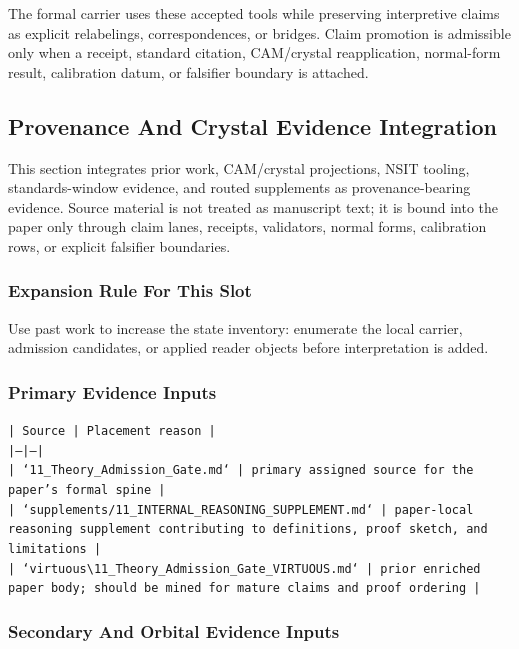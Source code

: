 \documentclass[11pt]{article}
\begin{document}
The formal carrier uses these accepted tools while preserving interpretive
claims as explicit relabelings, correspondences, or bridges. Claim promotion is admissible only when a receipt, standard citation,
CAM/crystal reapplication, normal-form result, calibration datum, or falsifier
boundary is attached.

\subsection*{Provenance And Crystal Evidence Integration}

This section integrates prior work, CAM/crystal projections, NSIT tooling,
standards-window evidence, and routed supplements as provenance-bearing
evidence. Source material is not treated as manuscript text; it is bound into
the paper only through claim lanes, receipts, validators, normal forms,
calibration rows, or explicit falsifier boundaries.

\subsubsection*{Expansion Rule For This Slot}

Use past work to increase the state inventory: enumerate the local carrier, admission candidates, or applied reader objects before interpretation is added.

\subsubsection*{Primary Evidence Inputs}

\noindent\texttt{| Source | Placement reason |}\\
\noindent\texttt{|---|---|}\\
\noindent\texttt{| `11\_Theory\_Admission\_Gate.md` | primary assigned source for the paper's formal spine |}\\
\noindent\texttt{| `supplements/11\_INTERNAL\_REASONING\_SUPPLEMENT.md` | paper-local reasoning supplement contributing to definitions, proof sketch, and limitations |}\\
\noindent\texttt{| `virtuous\textbackslash{}11\_Theory\_Admission\_Gate\_VIRTUOUS.md` | prior enriched paper body; should be mined for mature claims and proof ordering |}\\

\subsubsection*{Secondary And Orbital Evidence Inputs}
\end{document}
